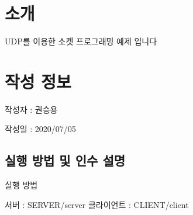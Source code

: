 \hypertarget{index_intro}{}\section{소개}\label{index_intro}

\begin{DoxyItemize}
\item U\-D\-P를 이용한 소켓 프로그래밍 예제 입니다 
\end{DoxyItemize}\hypertarget{index_CreatInfo}{}\section{작성 정보}\label{index_CreatInfo}

\begin{DoxyItemize}
\item 작성자 \-: 권승용
\item 작성일 \-: 2020/07/05 
\end{DoxyItemize}\hypertarget{index_exec}{}\subsection{실행 방법 및 인수 설명}\label{index_exec}

\begin{DoxyItemize}
\item 실행 방법\par
 서버 \-: S\-E\-R\-V\-E\-R/server 클라이언트 \-: C\-L\-I\-E\-N\-T/client 
\end{DoxyItemize}